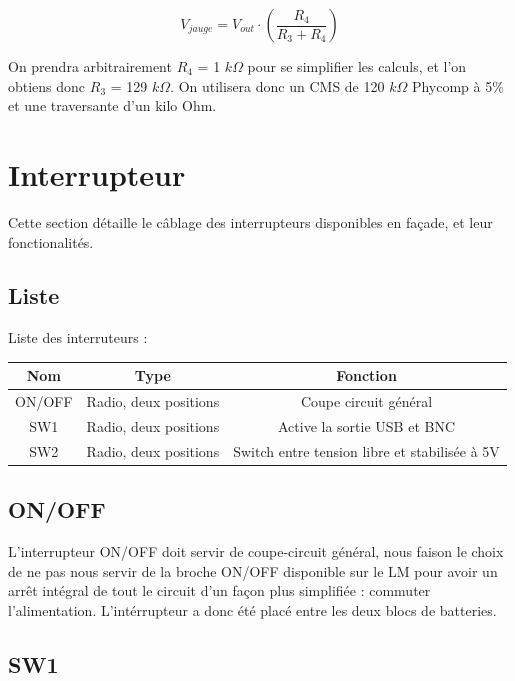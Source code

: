 \documentclass[12pt]{article}
\begin{document}
\begin{equation}
	\boxed{V_{jauge} = V_{out} \cdot ( \frac{R_4}{R_3 + R_4} )}
\end{equation}

On prendra arbitrairement $R_4$ = 1 $k\Omega$ pour se simplifier les calculs, et l'on obtiens donc $R_3$ = 129 $k\Omega$.
On utilisera donc un CMS de 120 $k\Omega$ Phycomp à 5\% et une traversante d'un kilo Ohm.





\newpage
\section{Interrupteur}

Cette section détaille le câblage des interrupteurs disponibles en façade, et leur fonctionalités.

\subsection{Liste}

Liste des interruteurs :\newline


\begin{tabular}{|c|c|c|}
	\hline
	Nom	& Type			& Fonction \\ \hline
	ON/OFF	& Radio, deux positions	& Coupe circuit général \\
	SW1	& Radio, deux positions & Active la sortie USB et BNC \\
	SW2	& Radio, deux positions & Switch entre tension libre et stabilisée à 5V \\
	\hline
\end{tabular}

\subsection{ON/OFF}

L'interrupteur ON/OFF doit servir de coupe-circuit général, nous faison le choix de ne pas nous servir de la broche
ON/OFF disponible sur le LM pour avoir un arrêt intégral de tout le circuit d'un façon plus simplifiée : commuter
l'alimentation. L'intérrupteur a donc été placé entre les deux blocs de batteries.

\subsection{SW1}
\end{document}
